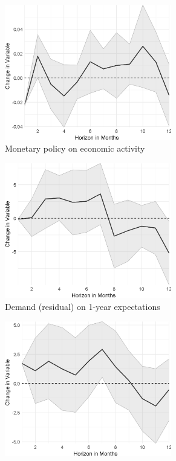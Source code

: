 \begin{figure}
\begin{subfigure}{00.24\textwidth}
		\includegraphics[width=0.8\textwidth]{output/lp/baseline/bHP/monetary_policy/monetary_policyoneconac_djn.eps}
		\caption{Monetary policy on economic activity}
	\end{subfigure}
	\begin{subfigure}{00.24\textwidth}
		\includegraphics[width=0.8\textwidth]{output/lp/baseline/bHP/demand/demandonexpectations1y_djn.eps}
		\caption{Demand (residual) on 1-year expectations}
	\end{subfigure}
	\begin{subfigure}{00.24\textwidth}
		\includegraphics[width=0.8\textwidth]{output/lp/baseline/bHP/demand/demandonexpectations3y_djn.eps}

\end{subfigure}
\end{figure}
